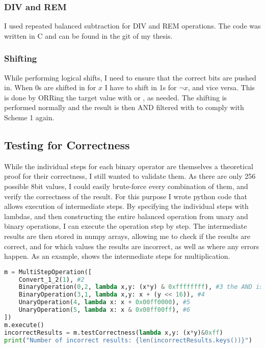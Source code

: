 \subsubsection{DIV and REM}
I used repeated balanced subtraction for DIV and REM operations.
The code was written in C and can be found in the git of my thesis\cite{git}.

\subsubsection{Shifting}
While performing logical shifts, I need to ensure that the correct bits are pushed in.
When 0s are shifted in for $x$ I have to shift in 1s for $\neg{x}$, and vice versa.
This is done by ORRing the target value with  or , as needed.
The shifting is performed normally and the result is then AND filtered with  to comply with Scheme 1 again.

\subsection{Testing for Correctness}
While the individual steps for each binary operator are themselves a theoretical proof for their correctness, I still wanted to validate them.
As there are only 256 possible 8bit values, I could easily brute-force every combination of them, and verify the correctness of the result.
For this purpose I wrote python code that allows execution of intermediate steps.
By specifying the individual steps with lambdas, and then constructing the entire balanced operation from unary and binary operations, I can execute the operation step by step.
The intermediate results are then stored in numpy arrays, allowing me to check if the results are correct, and for which values the results are incorrect, as well as where any errors happen.
As an example,  shows the intermediate steps for multiplication.

\begin{lstlisting}[language=python, caption=Step-by-step execution of balanced multiplication, label=lst:multiop]
m = MultiStepOperation([
    Convert_1_2(1), #2
    BinaryOperation(0,2, lambda x,y: (x*y) & 0xffffffff), #3 the AND is required due to python's arbitrary precision integers
    BinaryOperation(3,1, lambda x,y: x + (y << 16)), #4
    UnaryOperation(4, lambda x: x + 0x00ff0000), #5
    UnaryOperation(5, lambda x: x & 0x00ff00ff), #6
])
m.execute()
incorrectResults = m.testCorrectness(lambda x,y: (x*y)&0xff)
print("Number of incorrect results: {len(incorrectResults.keys())}")
\end{lstlisting}

